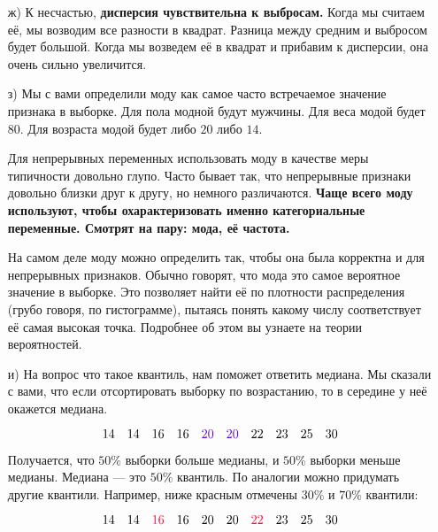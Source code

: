 \documentclass[12pt, a4paper, oneside]{article}
\theoremstyle{plain} %
\theoremstyle{definition}
\newcommand{\indef}[1]{\textbf{ \color{green} #1}}
\begin{document}
\begin{solution}
\begin{enumerate}
\begin{center}
\end{center}	

	\item[ж)]  К несчастью, \indef{дисперсия чувствительна к выбросам.} Когда мы считаем её, мы возводим все разности в квадрат. Разница между средним и выбросом будет большой. Когда мы возведем её в квадрат и прибавим к дисперсии, она очень сильно увеличится. 
	
	\item[з)] Мы с вами определили моду как самое часто встречаемое значение признака в выборке. Для пола модной будут мужчины. Для веса модой будет $80$. Для возраста модой будет либо $20$ либо $14$.  
	
	Для непрерывных переменных использовать моду в качестве меры типичности довольно глупо. Часто бывает так, что непрерывные признаки довольно близки друг к другу, но немного различаются. \indef{Чаще всего моду используют, чтобы охарактеризовать именно категориальные переменные. Смотрят на пару: мода, её частота.} 
	
	На самом деле моду можно определить так, чтобы она была корректна и для непрерывных признаков. Обычно говорят, что мода это самое вероятное значение в выборке.  Это позволяет найти её по плотности распределения (грубо говоря, по гистограмме), пытаясь понять какому числу соответствует её самая высокая точка. Подробнее об этом вы узнаете на теории вероятностей. 
	
	\item[и)]  На вопрос что такое квантиль, нам поможет ответить медиана. Мы сказали с вами, что если отсортировать выборку по возрастанию, то в середине у неё окажется медиана. 
	
	\[
	14 \quad 14  \quad 16  \quad 16  \quad {\color{purp} 20}  \quad {\color{purp} 20}  \quad 22  \quad 23  \quad 25  \quad 30
	\]
	
	Получается, что $50\%$ выборки больше медианы, и $50\%$ выборки меньше медианы. Медиана --- это $50\%$ квантиль. По аналогии можно придумать другие квантили. Например, ниже красным отмечены $30\%$ и $70\%$ квантили: 
	
	\[
	14 \quad 14  \quad {\color{red} 16}  \quad 16  \quad 20  \quad 20  \quad {\color{red} 22}  \quad 23  \quad 25  \quad 30
	\]
	

\end{enumerate}
\end{solution}
\end{document}
